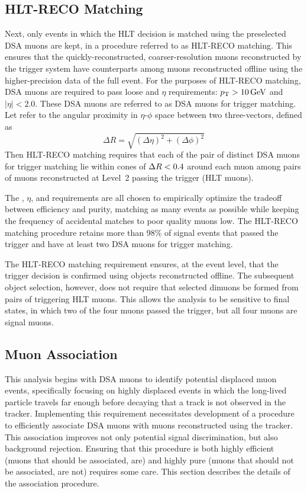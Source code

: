 \subsection{HLT-RECO Matching}
\label{sec:dd:HLTMatching}
Next, only events in which the HLT decision is matched using the preselected DSA muons are kept, in a procedure referred to as HLT-RECO matching.
This ensures that the quickly-reconstructed, coarser-resolution muons reconstructed by the trigger system have counterparts among muons reconstructed offline using the higher-precision data of the full event.
For the purposes of HLT-RECO matching, DSA muons are required to pass loose \pT and $\eta$ requirements: $p_{\mathrm{T}} > 10\,\text{Ge\hspace{-.08em}V}$ and $|\eta| < 2.0$.
These DSA muons are referred to as DSA muons for trigger matching.
Let \deltaR refer to the angular proximity in $\eta$-$\phi$ space between two three-vectors, defined as
\begin{equation}
  \Delta R = \sqrt{\left(\Delta\eta\right)^2 + \left(\Delta\phi\right)^2}
  \label{eq:dd:deltaR}
\end{equation}
Then HLT-RECO matching requires that each of the pair of distinct DSA muons for trigger matching lie within cones of $\Delta R < 0.4$ around each muon among pairs of muons reconstructed at Level~2 passing the trigger (HLT muons).

The \pT, $\eta$, and \deltaR requirements are all chosen to empirically optimize the tradeoff between efficiency and purity, matching as many events as possible while keeping the frequency of accidental matches to poor quality muons low.
The HLT-RECO matching procedure retains more than 98\% of \twoMu signal events that passed the trigger and have at least two DSA muons for trigger matching.

The HLT-RECO matching requirement ensures, at the event level, that the trigger decision is confirmed using objects reconstructed offline.
The subsequent object selection, however, does not require that selected dimuons be formed from pairs of triggering HLT muons.
This allows the analysis to be sensitive to \fourMu final states, in which two of the four muons passed the trigger, but all four muons are signal muons.

\subsection{\DSAToPAT Muon Association}
\label{sec:dd:Association}
This analysis begins with DSA muons to identify potential displaced muon events, specifically focusing on highly displaced events in which the long-lived particle travels far enough before decaying that a track is not observed in the tracker.
Implementing this requirement necessitates development of a procedure to efficiently associate DSA muons with muons reconstructed using the tracker.
This association improves not only potential signal discrimination, but also background rejection.
Ensuring that this procedure is both highly efficient (\ie muons that should be associated, are) and highly pure (\ie muons that should not be associated, are not) requires some care.
This section describes the details of the association procedure.

